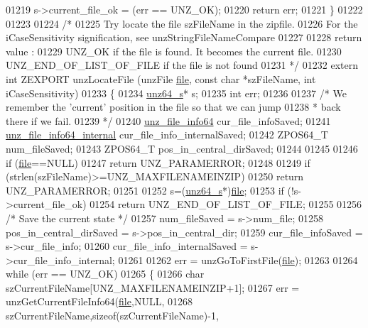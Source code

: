 \begin{DoxyCode}
01219     s->current\_file\_ok = (err == UNZ\_OK);
01220     \textcolor{keywordflow}{return} err;
01221 \}
01222 
01223 
01224 \textcolor{comment}{/*}
01225 \textcolor{comment}{  Try locate the file szFileName in the zipfile.}
01226 \textcolor{comment}{  For the iCaseSensitivity signification, see unzStringFileNameCompare}
01227 \textcolor{comment}{}
01228 \textcolor{comment}{  return value :}
01229 \textcolor{comment}{  UNZ\_OK if the file is found. It becomes the current file.}
01230 \textcolor{comment}{  UNZ\_END\_OF\_LIST\_OF\_FILE if the file is not found}
01231 \textcolor{comment}{*/}
01232 \textcolor{keyword}{extern} \textcolor{keywordtype}{int} ZEXPORT unzLocateFile (unzFile \hyperlink{structfile}{file}, \textcolor{keyword}{const} \textcolor{keywordtype}{char} *szFileName, \textcolor{keywordtype}{int} iCaseSensitivity)
01233 \{
01234     \hyperlink{structunz64__s}{unz64\_s}* s;
01235     \textcolor{keywordtype}{int} err;
01236 
01237     \textcolor{comment}{/* We remember the 'current' position in the file so that we can jump}
01238 \textcolor{comment}{     * back there if we fail.}
01239 \textcolor{comment}{     */}
01240     \hyperlink{structunz__file__info64__s}{unz\_file\_info64} cur\_file\_infoSaved;
01241     \hyperlink{structunz__file__info64__internal__s}{unz\_file\_info64\_internal} cur\_file\_info\_internalSaved;
01242     ZPOS64\_T num\_fileSaved;
01243     ZPOS64\_T pos\_in\_central\_dirSaved;
01244 
01245 
01246     \textcolor{keywordflow}{if} (\hyperlink{structfile}{file}==NULL)
01247         \textcolor{keywordflow}{return} UNZ\_PARAMERROR;
01248 
01249     \textcolor{keywordflow}{if} (strlen(szFileName)>=UNZ\_MAXFILENAMEINZIP)
01250         \textcolor{keywordflow}{return} UNZ\_PARAMERROR;
01251 
01252     s=(\hyperlink{structunz64__s}{unz64\_s}*)\hyperlink{structfile}{file};
01253     \textcolor{keywordflow}{if} (!s->current\_file\_ok)
01254         \textcolor{keywordflow}{return} UNZ\_END\_OF\_LIST\_OF\_FILE;
01255 
01256     \textcolor{comment}{/* Save the current state */}
01257     num\_fileSaved = s->num\_file;
01258     pos\_in\_central\_dirSaved = s->pos\_in\_central\_dir;
01259     cur\_file\_infoSaved = s->cur\_file\_info;
01260     cur\_file\_info\_internalSaved = s->cur\_file\_info\_internal;
01261 
01262     err = unzGoToFirstFile(\hyperlink{structfile}{file});
01263 
01264     \textcolor{keywordflow}{while} (err == UNZ\_OK)
01265     \{
01266         \textcolor{keywordtype}{char} szCurrentFileName[UNZ\_MAXFILENAMEINZIP+1];
01267         err = unzGetCurrentFileInfo64(\hyperlink{structfile}{file},NULL,
01268                                     szCurrentFileName,\textcolor{keyword}{sizeof}(szCurrentFileName)-1,

\end{DoxyCode}

